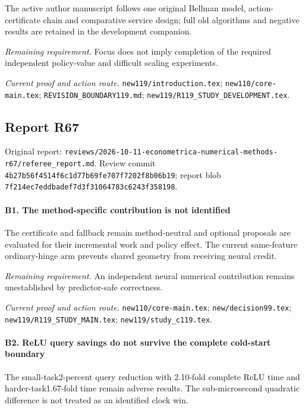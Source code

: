 The active author manuscript follows one original Bellman model, action-certificate chain and comparative service design; full old algorithms and negative results are retained in the development companion.

\par\emph{Remaining requirement.} Focus does not imply completion of the required independent policy-value and difficult scaling experiments.

\par\emph{Current proof and action route.} \nolinkurl{new119/introduction.tex}; \nolinkurl{new110/core-main.tex}; \nolinkurl{REVISION_BOUNDARY119.md}; \nolinkurl{new119/R119_STUDY_DEVELOPMENT.tex}.

\subsection{Report R67}

Original report: \nolinkurl{reviews/2026-10-11-econometrica-numerical-methods-r67/referee_report.md}. Review commit \nolinkurl{4b27b56f4514f6c1d77b69fe707f7202f8b06b19}; report blob \nolinkurl{7f214ec7eddbadef7d3f31064783c6243f358198}.

\paragraph{B1. The method-specific contribution is not identified}

The certificate and fallback remain method-neutral and optional proposals are evaluated for their incremental work and policy effect. The current same-feature ordinary-hinge arm prevents shared geometry from receiving neural credit.

\par\emph{Remaining requirement.} An independent neural numerical contribution remains unestablished by predictor-safe correctness.

\par\emph{Current proof and action route.} \nolinkurl{new110/core-main.tex}; \nolinkurl{new/decision99.tex}; \nolinkurl{new119/R119_STUDY_MAIN.tex}; \nolinkurl{new119/study_c119.tex}.

\paragraph{B2. ReLU query savings do not survive the complete cold-start boundary}

The small-task2-percent query reduction with 2.10-fold complete ReLU time and harder-task1.67-fold time remain adverse results. The sub-microsecond quadratic difference is not treated as an identified clock win.

